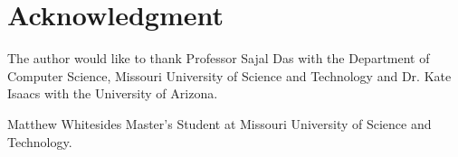 \documentclass[journal,onecolumn]{IEEEtran}
\begin{document}
\section*{Acknowledgment}
The author would like to thank Professor Sajal Das with the Department of Computer Science, Missouri University of Science and Technology and Dr. Kate Isaacs with the University of Arizona.

\ifCLASSOPTIONcaptionsoff
  \newpage
\fi




\begin{IEEEbiographynophoto}{Matthew Whitesides}
  Master's Student at Missouri University of Science and Technology.
\end{IEEEbiographynophoto}

\end{document}
